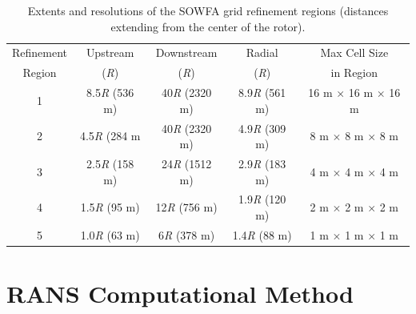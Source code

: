 \begin{table}
\centering
\begin{tabular}{c c c c c}
\hline
Refinement & Upstream  & Downstream & Radial & Max Cell Size\\
Region & (\emph{R}) & (\emph{R})  &  (\emph{R}) & in Region\\
\hline
1 & 8.5\emph{R} (536 m)  & 40\emph{R} (2320 m) & 8.9\emph{R} (561 m)  & 16 m $\times$ 16 m $\times$ 16 m\\
2 & 4.5\emph{R} (284 m   & 40\emph{R} (2320 m) & 4.9\emph{R} (309 m)  & 8 m $\times$ 8 m $\times$ 8 m\\
3 & 2.5\emph{R} (158 m)  & 24\emph{R} (1512 m) & 2.9\emph{R} (183 m)  & 4 m $\times$ 4 m $\times$ 4 m\\
4 & 1.5\emph{R} (95 m)    & 12\emph{R} (756 m)   & 1.9\emph{R} (120 m)  & 2 m $\times$ 2 m $\times$ 2 m\\
5 & 1.0\emph{R} (63 m)    & 6\emph{R} (378 m)     & 1.4\emph{R} (88 m)   & 1 m $\times$ 1 m $\times$ 1 m\\
\hline
\end{tabular}
\caption{ Extents and resolutions of the SOWFA grid refinement regions (distances extending from the center of the rotor).}
\label{Table5-1}
\end{table}



\section{RANS Computational Method}\label{section5-3}

